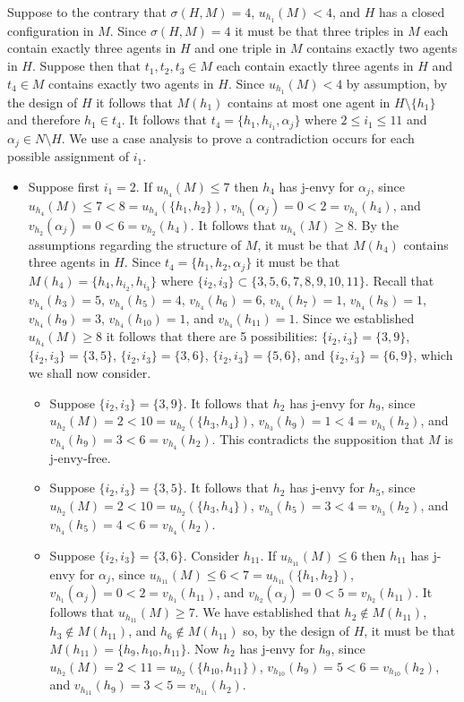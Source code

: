 Suppose to the contrary that $\sigma(H, M) = 4$, $u_{h_1}(M) < 4$, and $H$ has a closed configuration in $M$. Since $\sigma(H, M) = 4$ it must be that three triples in $M$ each contain exactly three agents in $H$ and one triple in $M$ contains exactly two agents in $H$. Suppose then that $t_1, t_2, t_3 \in M$ each contain exactly three agents in $H$ and $t_4 \in M$ contains exactly two agents in $H$. Since $u_{h_1}(M) < 4$ by assumption, by the design of $H$ it follows that $M(h_1)$ contains at most one agent in $H \setminus \{ h_1 \}$ and therefore $h_1 \in t_4$. It follows that $t_4 = \{ h_1, h_{i_1}, \alpha_{j} \}$ where $2 \leq i_1 \leq 11$ and $\alpha_{j} \in N \setminus H$. We use a case analysis to prove a contradiction occurs for each possible assignment of $i_1$. 

\begin{itemize}
    \item Suppose first $i_1 = 2$. If $u_{h_4}(M) \leq 7$ then $h_4$ has j-envy for $\alpha_{j}$, since $u_{h_4}(M) \leq 7 < 8 = u_{h_4}(\{ h_1, h_2 \})$, $v_{h_1}(\alpha_{j}) = 0 < 2 = v_{h_1}(h_4)$, and $v_{h_2}(\alpha_{j}) = 0 < 6 = v_{h_2}(h_4)$. It follows that $u_{h_4}(M) \geq 8$. By the assumptions regarding the structure of $M$, it must be that $M(h_4)$ contains three agents in $H$. Since $t_4 = \{ h_1, h_2, \alpha_{j} \}$ it must be that $M(h_4) = \{ h_4, h_{i_2}, h_{i_3} \}$ where $\{ i_2, i_3 \} \subset \{ 3, 5, 6, 7, 8, 9, 10, 11 \}$. Recall that $v_{h_4}(h_3)=5$, $v_{h_4}(h_5)=4$, $v_{h_4}(h_6)=6$, $v_{h_4}(h_7)=1$, $v_{h_4}(h_8)=1$, $v_{h_4}(h_9)=3$, $v_{h_4}(h_{10})=1$, and $v_{h_4}(h_{11})=1$. Since we established $u_{h_4}(M) \geq 8$ it follows that there are 5 possibilities: $\{ i_2, i_3 \} = \{ 3, 9 \}$, $\{ i_2, i_3 \} = \{ 3, 5 \}$, $\{ i_2, i_3 \} = \{ 3, 6 \}$, $\{ i_2, i_3 \} = \{ 5, 6 \}$, and $\{ i_2, i_3 \} = \{ 6, 9 \}$, which we shall now consider.
\begin{itemize}
    \item Suppose $\{ i_2, i_3 \} = \{ 3, 9 \}$. It follows that $h_2$ has j-envy for $h_9$, since $u_{h_2}(M) = 2 < 10 = u_{h_2}(\{ h_3, h_4 \})$, $v_{h_3}(h_9) = 1 < 4 = v_{h_3}(h_2)$, and $v_{h_4}(h_9) = 3 < 6 = v_{h_4}(h_2)$. This contradicts the supposition that $M$ is j-envy-free.
    \item Suppose $\{ i_2, i_3 \} = \{ 3, 5 \}$. It follows that $h_2$ has j-envy for $h_5$, since $u_{h_2}(M) = 2 < 10 = u_{h_2}(\{ h_3, h_4 \})$, $v_{h_3}(h_5) = 3 < 4 = v_{h_3}(h_2)$, and $v_{h_4}(h_5) = 4 < 6 = v_{h_4}(h_2)$. 
    \item Suppose $\{ i_2, i_3 \} = \{ 3, 6 \}$. Consider $h_{11}$. If $u_{h_{11}}(M) \leq 6$ then $h_{11}$ has j-envy for $\alpha_{j}$, since $u_{h_{11}}(M) \leq 6 < 7 = u_{h_{11}}(\{ h_1, h_2 \})$, $v_{h_1}(\alpha_{j}) = 0 < 2 = v_{h_1}(h_{11})$, and $v_{h_2}(\alpha_{j}) = 0 < 5 = v_{h_2}(h_{11})$. It follows that $u_{h_{11}}(M) \geq 7$. We have established that $h_2 \notin M(h_{11})$, $h_3 \notin M(h_{11})$, and $h_6 \notin M(h_{11})$ so, by the design of $H$, it must be that $M(h_{11}) = \{ h_9, h_{10}, h_{11} \}$. Now $h_2$ has j-envy for $h_9$, since $u_{h_2}(M) = 2 < 11 = u_{h_2}(\{ h_{10}, h_{11} \})$, $v_{h_{10}}(h_9) = 5 < 6 = v_{h_{10}}(h_2)$, and $v_{h_{11}}(h_9) = 3 < 5 = v_{h_{11}}(h_2)$.

\end{itemize}
\end{itemize}
